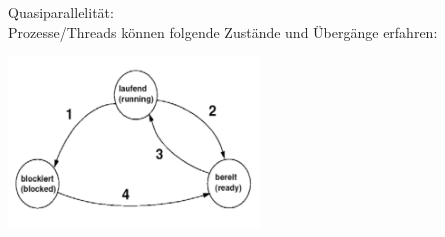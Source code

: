 Quasiparallelität:\\
Prozesse/Threads können folgende Zustände und Übergänge erfahren: 
\begin{center}
{\includegraphics[width=0.5\textwidth]{images/Concurrency/Prozesszustaende.png}}
\end{center}
